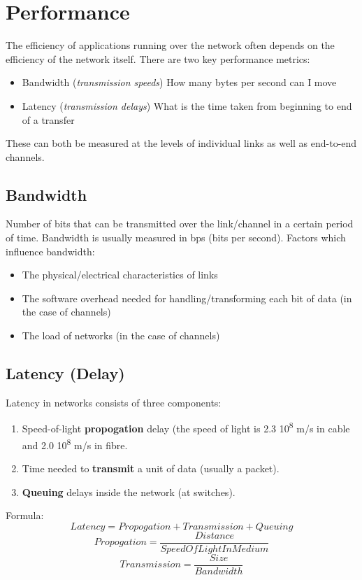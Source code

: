 \documentclass[11pt]{article}
\begin{document}
\section{Performance}
\label{sec:org8dc7222}
The efficiency of applications running over the network often depends on the efficiency of the network itself.
There are two key performance metrics:
\begin{itemize}
\item Bandwidth (\emph{transmission speeds}) How many bytes per second can I move
\item Latency (\emph{transmission delays}) What is the time taken from beginning to end of a transfer
\end{itemize}
These can both be measured at the levels of individual links as well as end-to-end channels.

\subsection{Bandwidth}
\label{sec:org2ab1e60}
Number of bits that can be transmitted over the link/channel in a certain period of time.
Bandwidth is usually measured in bps (bits per second).
Factors which influence bandwidth:
\begin{itemize}
\item The physical/electrical characteristics of links
\item The software overhead needed for handling/transforming each bit of data (in the case of channels)
\item The load of networks (in the case of channels)
\end{itemize}

\subsection{Latency (Delay)}
\label{sec:org426f532}
Latency in networks consists of three components:
\begin{enumerate}
\item Speed-of-light \textbf{propogation} delay (the speed of light is 2.3\texttimes{} 10\textsuperscript{8} m/s in cable and 2.0 \texttimes{} 10\textsuperscript{8} m/s in fibre.
\item Time needed to \textbf{transmit} a unit of data (usually a packet).
\item \textbf{Queuing} delays inside the network (at switches).
\end{enumerate}
Formula:
\begin{equation}
Latency = Propogation + Transmission + Queuing
\end{equation}
\begin{equation}
Propogation = \frac{Distance}{SpeedOfLightInMedium}
\end{equation}
\begin{equation}
Transmission = \frac{Size}{Bandwidth}
\end{equation}
\end{document}
